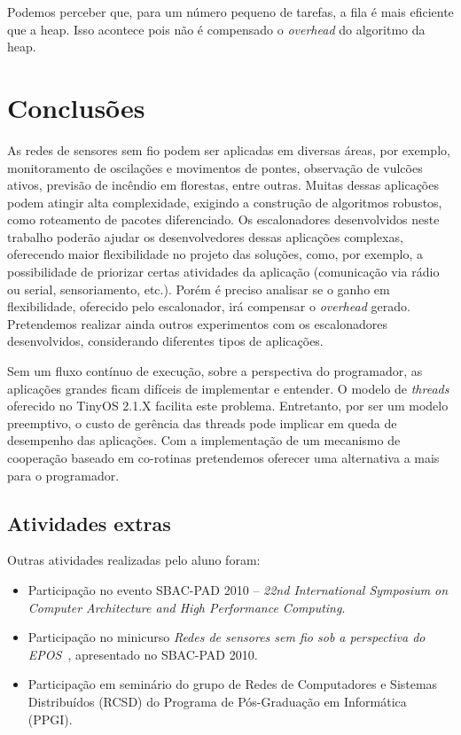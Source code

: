 \documentclass[a4paper,onecolumn, 10pt]{article}
\begin{document}
Podemos perceber que, para um número pequeno de tarefas, a fila é mais eficiente que a heap. Isso acontece pois
não é compensado o \textit{overhead} do algoritmo da heap.

\section{Conclusões}\label{conclusoes}
As redes de sensores sem fio podem ser aplicadas em diversas áreas, por exemplo, monitoramento de oscilações 
e movimentos de pontes, observação de vulcões ativos, previsão de incêndio em florestas, entre outras. 
Muitas dessas aplicações podem atingir alta complexidade, exigindo a construção de algoritmos robustos, 
como roteamento de pacotes diferenciado.
Os escalonadores desenvolvidos neste trabalho poderão ajudar os desenvolvedores dessas aplicações complexas,
oferecendo maior flexibilidade no projeto das soluções, como, por exemplo, 
a possibilidade de priorizar certas atividades da aplicação (comunicação via rádio ou serial, sensoriamento, etc.).
Porém é preciso analisar se o ganho em flexibilidade, oferecido pelo escalonador, irá compensar o
\textit{overhead} gerado.
Pretendemos realizar ainda outros experimentos com os escalonadores desenvolvidos, considerando diferentes
tipos de aplicações. 

Sem um fluxo contínuo de execução, sobre a perspectiva do programador, as aplicações grandes ficam difíceis de
implementar e entender. O modelo de \textit{threads} oferecido no 
TinyOS 2.1.X\cite{TEP134} facilita este problema. Entretanto, por ser um modelo preemptivo, o custo de
gerência das threads pode implicar em queda de desempenho das aplicações. 
Com a implementação de um mecanismo de cooperação baseado em co-rotinas pretendemos
oferecer uma alternativa a mais para o programador.


\subsection{Atividades extras}
Outras atividades realizadas pelo aluno foram:
\begin{itemize}
    \item Participação no evento SBAC-PAD 2010 -- 
{\em 22nd International Symposium on Computer Architecture and High Performance Computing}.
    \item Participação no minicurso 
{\em Redes de sensores sem fio sob a perspectiva do EPOS}~\cite{HoellerFrohlich/10}, 
apresentado no SBAC-PAD 2010.    
    \item Participação em seminário do grupo de Redes de Computadores e Sistemas Distribuídos (RCSD)
do Programa de Pós-Graduação em Informática (PPGI).
\end{itemize}
\end{document}
